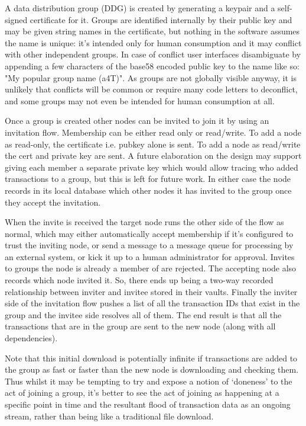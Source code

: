 \documentclass{article}
\begin{document}
A data distribution group (DDG) is created by generating a keypair and a self-signed certificate for it. Groups are
identified internally by their public key and may be given string names in the certificate, but nothing in the
software assumes the name is unique: it's intended only for human consumption and it may conflict with other independent
groups. In case of conflict user interfaces disambiguate by appending a few characters of the base58 encoded public key
to the name like so:  "My popular group name (a4T)". As groups are not globally visible anyway, it is unlikely that
conflicts will be common or require many code letters to deconflict, and some groups may not even be intended for
human consumption at all.

Once a group is created other nodes can be invited to join it by using an invitation flow. Membership can be either
read only or read/write. To add a node as read-only, the certificate i.e. pubkey alone is sent. To add a node as
read/write the cert and private key are sent. A future elaboration on the design may support giving each member a
separate private key which would allow tracing who added transactions to a group, but this is left for future work.
In either case the node records in its local database which other nodes it has invited to the group once they accept
the invitation.

When the invite is received the target node runs the other side of the flow as normal, which may either automatically
accept membership if it's configured to trust the inviting node, or send a message to a message queue for processing by an
external system, or kick it up to a human administrator for approval. Invites to groups the node is already a
member of are rejected. The accepting node also records which node invited it. So, there ends up being a two-way
recorded relationship between inviter and invitee stored in their vaults. Finally the inviter side of the
invitation flow pushes a list of all the transaction IDs that exist in the group and the invitee side resolves all of
them. The end result is that all the transactions that are in the group are sent to the new node (along with all
dependencies).

Note that this initial download is potentially infinite if transactions are added to the group as fast or faster than the
new node is downloading and checking them. Thus whilst it may be tempting to try and expose a notion of `doneness' to
the act of joining a group, it's better to see the act of joining as happening at a specific point in time and the
resultant flood of transaction data as an ongoing stream, rather than being like a traditional file download.
\end{document}
